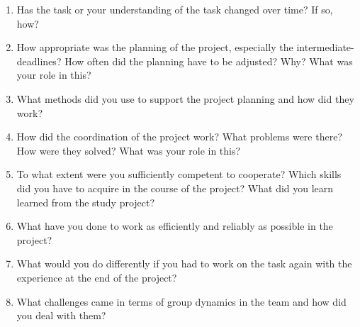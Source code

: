 \documentclass[
fontsize=11pt,
paper=a4,
abstract=true,
numbers=noenddot,
listof=totoc,
bibliography=totoc,
twoside,
open=right,
cleardoublepage=plain,
parskip=half+, %
BCOR=1cm, %
]{scrreprt}
\begin{document}
\begin{enumerate}
    \item Has the task or your understanding of the task changed over time? If so, how?
    \item How appropriate was the planning of the project, especially the intermediate-deadlines? How often did the planning have to be adjusted? Why? What was your role in this?
    \item What methods did you use to support the project planning and how did they work?
    \item How did the coordination of the project work? What problems were there? How were they solved? What was your role in this?
    \item To what extent were you sufficiently competent to cooperate? Which skills did you have to acquire in the course of the project? What did you learn learned from the study project?
    \item What have you done to work as efficiently and reliably as possible in the project?
    \item What would you do differently if you had to work on the task again with the experience at the end of the project?
    \item What challenges came in terms of group dynamics in the team and how did you deal with them?
\end{enumerate}
\end{document}
